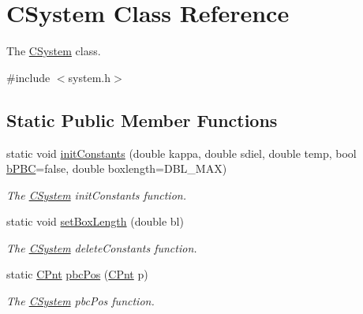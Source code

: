 \hypertarget{classCSystem}{\section{C\-System Class Reference}
\label{classCSystem}
}


The \hyperlink{classCSystem}{C\-System} class.  




{\ttfamily \#include $<$system.\-h$>$}

\subsection*{Static Public Member Functions}
\begin{DoxyCompactItemize}
\item 
static void \hyperlink{classCSystem_ac237dc9cd329e8886ab2b419596dded9}{init\-Constants} (double kappa, double sdiel, double temp, bool \hyperlink{classCSystem_ad4220c7ae13d01939b760aa998afe9f0}{b\-P\-B\-C}=false, double boxlength=D\-B\-L\-\_\-\-M\-A\-X)
\begin{DoxyCompactList}\small\item\em The \hyperlink{classCSystem}{C\-System} init\-Constants function. \end{DoxyCompactList}\item 
static void \hyperlink{classCSystem_a730251f2318aa9f1247808773903f57a}{set\-Box\-Length} (double bl)
\begin{DoxyCompactList}\small\item\em The \hyperlink{classCSystem}{C\-System} delete\-Constants function. \end{DoxyCompactList}\item 
static \hyperlink{classCPnt}{C\-Pnt} \hyperlink{classCSystem_a29136721e5abd3ee40781adbee13d9e0}{pbc\-Pos} (\hyperlink{classCPnt}{C\-Pnt} p)
\begin{DoxyCompactList}\small\item\em The \hyperlink{classCSystem}{C\-System} pbc\-Pos function. \end{DoxyCompactList}\end{DoxyCompactItemize}
